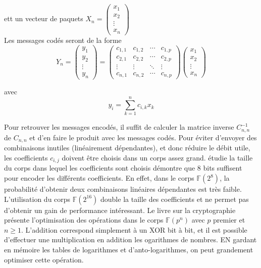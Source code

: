 \documentclass[frenchb]{article}
\begin{document}
ett un vecteur de paquets $X_n = 
\begin{pmatrix}
x_1\\
x_2\\
\vdots\\
x_n
\end{pmatrix}$\\
Les messages codés seront de la forme $$Y_n =
\begin{pmatrix}
y_1\\
y_2\\
\vdots\\
y_n
\end{pmatrix} =
\begin{pmatrix}
  c_{1,1} & c_{1,2} & \cdots & c_{1,p} \\
  c_{2,1} & c_{2,2} & \cdots & c_{2,p} \\
  \vdots  & \vdots  & \ddots & \vdots  \\
  c_{n,1} & c_{n,2} & \cdots & c_{n,p}
\end{pmatrix} 
\begin{pmatrix}
x_1\\
x_2\\
\vdots\\
x_n
\end{pmatrix}$$

avec $$y_i = \sum_{k=1}^{n} c_{i,k}x_k$$

Pour retrouver les messages encodés, il suffit de calculer la matrice inverse $C_{n,n}^{-1}$ de $C_{n,n}$ et d'en faire le produit avec les messages codés.
Pour éviter d'envoyer des combinaisons inutiles (linéairement dépendantes), et donc réduire le débit utile, les coefficients $c_{i,j}$ doivent être choisis dans un corps assez grand. \cite{practicalnetwork} étudie la taille du corps dans lequel les coefficients sont choisis démontre que 8 bits suffisent pour encoder les différents coefficients. En effet, dans le corps $\mathbb{F}(2^8)$, la probabilité d'obtenir deux combinaisons linéaires dépendantes est très faible. L'utilisation du corps $\mathbb{F}(2^{16})$ double la taille des coefficients et ne permet pas d'obtenir un gain de performance intéressant. Le livre sur la cryptographie \cite{java} présente l'optimisation des opérations dans le corps $\mathbb{F}(p^n)$ avec $p$ premier et $n \ge 1$. L'addition correspond simplement à un \textsf{XOR} bit à bit, et il est possible d'effectuer une multiplication en addition les ogarithmes de nombres. EN gardant en mémoire les tables de logarithmes et d'anto-logarithmes, on peut grandement optimiser cette opération.
\end{document}
